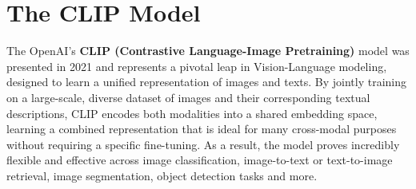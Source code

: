\documentclass[a4paper, twoside, english]{sapthesis} %
\begin{document}




\chapter{The CLIP Model} %

The OpenAI's \textbf{CLIP (Contrastive Language-Image Pretraining)} model \cite{radford2021learning} was presented in 2021 and represents a pivotal leap in Vision-Language modeling, designed to learn a unified representation of images and texts. By jointly training on a large-scale, diverse dataset of images and their corresponding textual descriptions, CLIP encodes both modalities into a shared embedding space, learning a combined representation that is ideal for many cross-modal purposes without requiring a specific fine-tuning. As a result, the model proves incredibly flexible and effective across image classification, image-to-text or text-to-image retrieval, image segmentation, object detection tasks and more. \\
\end{document}
